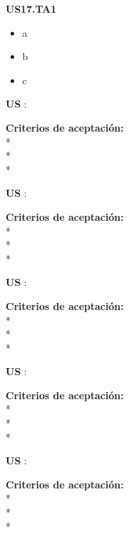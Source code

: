 \begin{tcolorbox}
\textbf{US17.TA1}
\begin{itemize}
\item a
\item b
\item c
\end{itemize}
\end{tcolorbox}
\vspace{10pt}


\begin{tcolorbox}
\textbf{US }: %

\vline

\textbf{Criterios de aceptación:}\\
* \\ %
* \\ %
* \\ %
\end{tcolorbox}
\vspace{10pt}



\begin{tcolorbox}
\textbf{US }: %

\vline

\textbf{Criterios de aceptación:}\\
* \\ %
* \\ %
* \\ %
\end{tcolorbox}
\vspace{10pt}




\begin{tcolorbox}
\textbf{US }: %

\vline

\textbf{Criterios de aceptación:}\\
* \\ %
* \\ %
* \\ %
\end{tcolorbox}
\vspace{10pt}




\begin{tcolorbox}
\textbf{US }: %

\vline

\textbf{Criterios de aceptación:}\\
* \\ %
* \\ %
* \\ %
\end{tcolorbox}
\vspace{10pt}



\begin{tcolorbox}
\textbf{US }: %

\vline

\textbf{Criterios de aceptación:}\\
* \\ %
* \\ %
* \\ %
\end{tcolorbox}
\vspace{10pt}